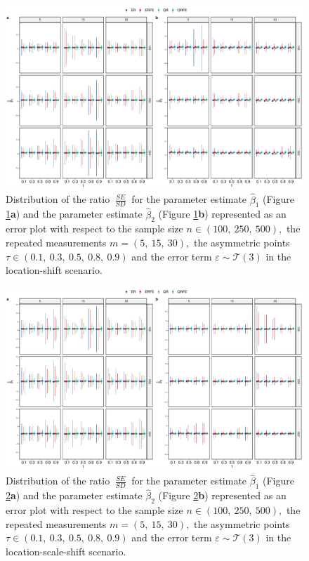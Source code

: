 \documentclass[15pt,a4paper]{article}
\DeclareMathOperator{\SE}{\textit{SE}}
\DeclareMathOperator{\SD}{\textit{SD}}
\begin{document}
\begin{center}
\begin{figure}[hbt!]
\includegraphics[width=0.75\linewidth]{Graph_supp/SdSe_stud_homo}
    \caption{Distribution of the ratio $\frac{\SE}{\SD}$ for the parameter estimate $\widehat{\beta}_1$ (Figure \ref{fig:SdSe_stud_homo}\textbf{a}) and the parameter estimate $\widehat{\beta}_2$ (Figure \ref{fig:SdSe_stud_homo}\textbf{b}) represented as an error plot with respect to the sample size $n\in(100,  \ 250,  \ 500),$ the repeated measurements $m=(5,\ 15,\ 30),$ the asymmetric points $\tau\in (0.1,  \ 0.3,  \  0.5, \  0.8,\ 0.9)$ and the error term $\varepsilon\sim\mathcal{T}(3)$ in the location-shift scenario.} \label{fig:SdSe_stud_homo}
\end{figure}
\end{center}

\begin{center}
\begin{figure}[hbt!]
\includegraphics[width=0.75\linewidth]{Graph_supp/SdSe_stud_hetero}
    \caption{Distribution of the ratio $\frac{\SE}{\SD}$ for the parameter estimate $\widehat{\beta}_1$ (Figure \ref{fig:SdSe_stud_hetero}\textbf{a}) and the parameter estimate $\widehat{\beta}_2$ (Figure \ref{fig:SdSe_stud_hetero}\textbf{b}) represented as an error plot with respect to the sample size $n\in(100,  \ 250,  \ 500),$ the repeated measurements $m=(5,\ 15,\ 30),$ the asymmetric points $\tau\in (0.1,  \ 0.3,  \  0.5, \  0.8,\ 0.9)$ and the error term $\varepsilon\sim\mathcal{T}(3)$ in the location-scale-shift scenario.} \label{fig:SdSe_stud_hetero}
\end{figure}
\end{center}
\end{document}
